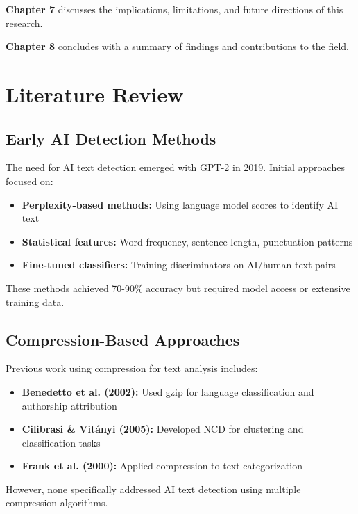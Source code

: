 \documentclass[12pt,a4paper]{report}
\begin{document}
\textbf{Chapter 7} discusses the implications, limitations, and future directions of this research.

\textbf{Chapter 8} concludes with a summary of findings and contributions to the field.

\section{Literature Review}

\subsection{Early AI Detection Methods}

The need for AI text detection emerged with GPT-2 in 2019. Initial approaches focused on:

\begin{itemize}
    \item \textbf{Perplexity-based methods:} Using language model scores to identify AI text \cite{solaiman2019detecting}
    \item \textbf{Statistical features:} Word frequency, sentence length, punctuation patterns
    \item \textbf{Fine-tuned classifiers:} Training discriminators on AI/human text pairs
\end{itemize}

These methods achieved 70-90\% accuracy but required model access or extensive training data.

\subsection{Compression-Based Approaches}

Previous work using compression for text analysis includes:

\begin{itemize}
    \item \textbf{Benedetto et al. (2002):} Used gzip for language classification and authorship attribution
    \item \textbf{Cilibrasi \& Vitányi (2005):} Developed NCD for clustering and classification tasks
    \item \textbf{Frank et al. (2000):} Applied compression to text categorization
\end{itemize}

However, none specifically addressed AI text detection using multiple compression algorithms.
\end{document}
